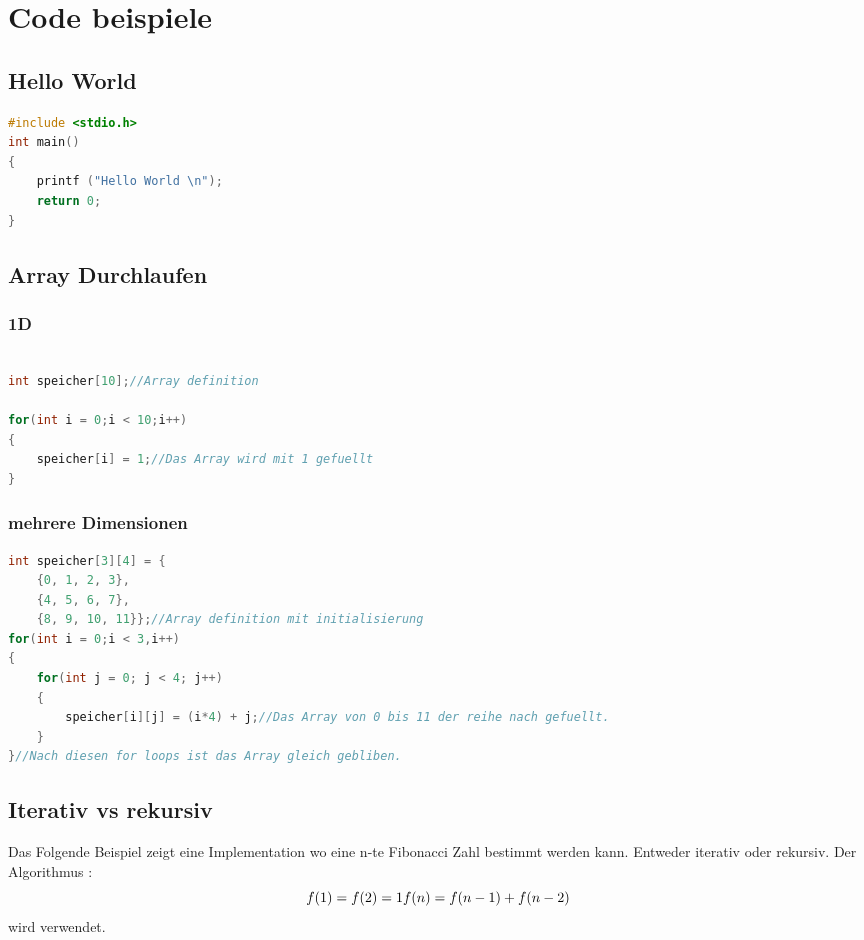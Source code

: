 \section{Code beispiele}

\subsection{Hello World}

\begin{lstlisting}[language = c]
#include <stdio.h>
int main()
{
    printf ("Hello World \n");
    return 0;
}
\end{lstlisting}

\subsection{Array Durchlaufen}

\subsubsection{1D}

\begin{lstlisting}[language = c]

int speicher[10];//Array definition

for(int i = 0;i < 10;i++)
{
    speicher[i] = 1;//Das Array wird mit 1 gefuellt
}
\end{lstlisting}

\subsubsection{mehrere Dimensionen}

\begin{lstlisting}[language = c]
int speicher[3][4] = {
    {0, 1, 2, 3},
    {4, 5, 6, 7},
    {8, 9, 10, 11}};//Array definition mit initialisierung
for(int i = 0;i < 3,i++)
{
    for(int j = 0; j < 4; j++)
    {
        speicher[i][j] = (i*4) + j;//Das Array von 0 bis 11 der reihe nach gefuellt.  
    }
}//Nach diesen for loops ist das Array gleich gebliben.
\end{lstlisting}

\vfill\null
\columnbreak	

\subsection{Iterativ vs rekursiv}

Das Folgende Beispiel zeigt eine Implementation wo eine n-te Fibonacci Zahl bestimmt werden kann. Entweder iterativ oder rekursiv.\newline
Der Algorithmus : \[ f(1) = f(2) = 1 \newline f(n) = f(n-1) + f(n-2) \] wird verwendet.

